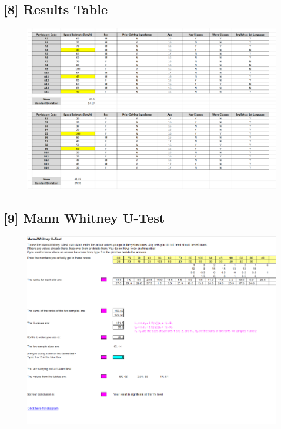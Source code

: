 \documentclass[12pt]{article}
\begin{document}
\subsection*{[8] Results Table}
\begin{figure}[H]
	\includegraphics[scale=0.8]{results_table}
	\centering
\end{figure}

\subsection*{[9] Mann Whitney U-Test}
\begin{figure}[H]
	\includegraphics[scale=0.9]{mann-test}
	\centering
\end{figure}
\end{document}
